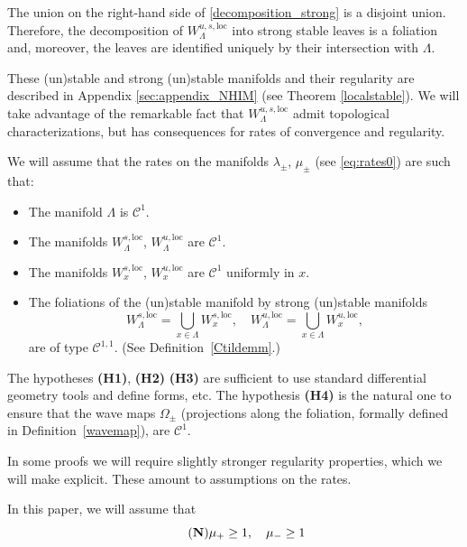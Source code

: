 \documentclass[11pt]{amsart}
\theoremstyle{definition}
\theoremstyle{remark}
\numberwithin{equation}{section}
\newcommand{\C}{\mathcal{C}}
\begin{document}
The union on the right-hand side of \eqref{decomposition_strong}
is a disjoint union. Therefore, the decomposition
of $W^{u,s, \textrm{loc}}_\Lambda$ into strong stable
leaves is a foliation and, moreover,
the leaves are identified uniquely by their
intersection with $\Lambda$.

These (un)stable and strong (un)stable manifolds and their regularity are described  in Appendix \ref{sec:appendix_NHIM} (see  Theorem \ref{localstable}).
We will take advantage of the remarkable fact that $W^{u,s, \textrm{loc}}_\Lambda$ admit topological
characterizations, but has consequences for rates of convergence and regularity.


We will assume that the rates on the manifolds $\lambda _\pm$, $\mu_\pm$ (see \eqref {eq:rates0}) are such that:
\begin{itemize}
\item[ {\bf (H1)}]
The manifold $\Lambda$  is $\C^1$.
\item[ {\bf (H2)}]
The manifolds $W^{s,\textrm{loc}}_\Lambda$,
  $W^{u ,\textrm{loc}}_\Lambda$ are  $\C^1$.
  \item[ {\bf (H3)}]
  The manifolds $W^{s,\textrm{loc}}_x$,
  $W^{u ,\textrm{loc}}_x$ are  $\C^1$ uniformly in $x$.
  \item[ {\bf (H4)}]
  The  foliations  of the (un)stable manifold
  by strong (un)stable  manifolds
\begin{equation}\label{foliationsstablemanifolds}
W^{s,\textrm{loc}}_\Lambda = \bigcup_{x \in \Lambda}  W^{s,\textrm{loc}}_x,
  \quad
 W^{u,\textrm{loc}}_\Lambda = \bigcup_{x \in \Lambda}  W^{u,\textrm{loc}}_x,
\end{equation}
are of type $\C^{1,1}$. (See Definition~\ref{Ctildemm}.)
\end{itemize}

The hypotheses {\bf (H1)}, {\bf (H2)} {\bf (H3)}
are sufficient to use standard
differential geometry tools and define forms, etc.
The hypothesis {\bf (H4)} is the natural one  to ensure that  the wave maps
$\Omega_\pm$  (projections along the foliation, formally defined in Definition~\ref{wavemap}), are
$\C^1$.

In some proofs we will require  slightly stronger  regularity properties,
which we will make explicit.  These amount to assumptions on
the rates.

\medskip

In this paper,
we will assume that
\begin{equation}
  \label{eqn:mubounds}
  \tag{{\bf N}}
\mu_+\ge 1, \quad \mu_-  \ge 1
\end{equation}
\end{document}
